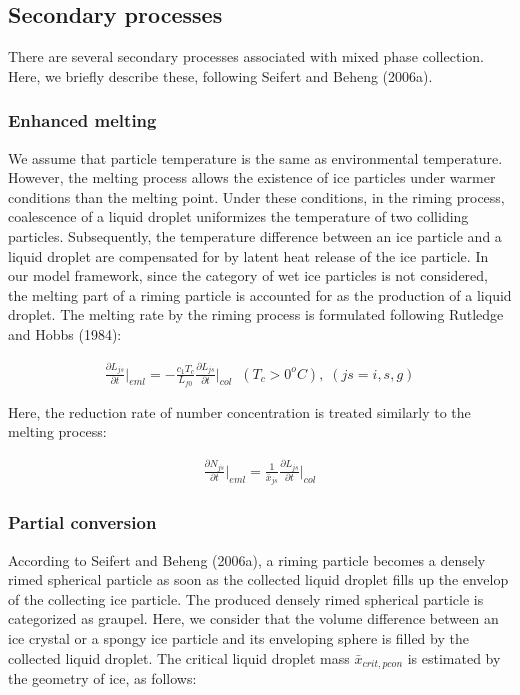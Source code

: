 \subsection{Secondary processes}
There are several secondary processes associated with mixed phase collection. Here, we briefly describe these, following Seifert and Beheng (2006a).

\subsubsection{Enhanced melting}
We assume that particle temperature is the same as environmental temperature. However, the melting process allows the existence of ice particles under warmer conditions than the melting point. Under these conditions, in the riming process, coalescence of a liquid droplet uniformizes the temperature of two colliding particles. Subsequently, the temperature difference between an ice particle and a liquid droplet are compensated for by latent heat release of the ice particle. In our model framework, since the category of wet ice particles is not considered, the melting part of a riming particle is accounted for as the production of a liquid droplet. The melting rate by the riming process is formulated following Rutledge and Hobbs (1984):

\begin{eqnarray}
\frac{\partial L_{js}}{\partial t}\Bigr|_{eml}=-\frac{c_{1}T_{c}}{L_{f0}}\frac{\partial L_{js}}{\partial t}\Bigr|_{col}\;\;(T_{c}>0^{o}C),\;(js=i,s,g)\label{sn205}
\end{eqnarray}

Here, the reduction rate of number concentration is treated similarly to the melting process:

\begin{eqnarray}
\frac{\partial N_{js}}{\partial t}\Bigr|_{eml}=\frac{1}{\bar{x}_{js}}\frac{\partial L_{js}}{\partial t}\Bigr|_{col}\label{sn206}
\end{eqnarray}

\subsubsection{Partial conversion}
According to Seifert and Beheng (2006a), a riming particle becomes a densely rimed spherical particle as soon as the collected liquid droplet fills up the envelop of the collecting ice particle. The produced densely rimed spherical particle is categorized as graupel. Here, we consider that the volume difference between an ice crystal or a spongy ice particle and its enveloping sphere is filled by the collected liquid droplet. The critical liquid droplet mass $\bar{x}_{crit,pcon}$ is estimated by the geometry of ice, as follows:

